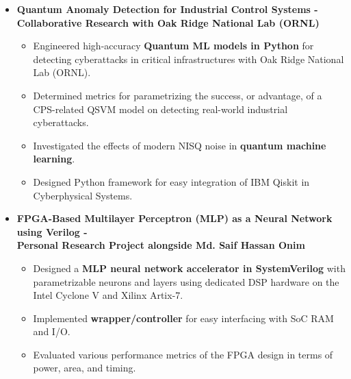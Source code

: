 \documentclass[line,margin,9pt]{res}
\begin{document}
\begin{resume}
\begin{itemize}
\item \textbf{Quantum Anomaly Detection for Industrial Control Systems - \\
	\small{Collaborative Research with Oak Ridge National Lab (ORNL)}}  
\begin{itemize}
\item Engineered high-accuracy \textbf{Quantum ML models in Python} for detecting cyberattacks in critical infrastructures with Oak Ridge National Lab (ORNL).
\item Determined metrics for parametrizing the success, or advantage, of a CPS-related QSVM model on detecting real-world industrial cyberattacks.
\item Investigated the effects of modern NISQ noise in \textbf{quantum machine learning}.
\item Designed Python framework for easy integration of IBM Qiskit in Cyberphysical Systems.
\end{itemize}

\item \textbf{FPGA-Based Multilayer Perceptron (MLP) as a Neural Network using Verilog - \\
	\small{Personal Research Project alongside Md. Saif Hassan Onim}} 
\begin{itemize}
\item Designed a \textbf{MLP neural network accelerator in SystemVerilog} with parametrizable neurons and layers using dedicated DSP hardware on the Intel Cyclone V and Xilinx Artix-7.
\item Implemented \textbf{wrapper/controller} for easy interfacing with SoC RAM and I/O.
\item Evaluated various performance metrics of the FPGA design in terms of power, area, and timing.
\end{itemize}



\end{itemize}
\end{resume}
\end{document}
